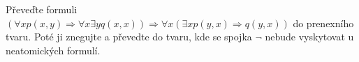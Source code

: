 Převeďte formuli $(\forall x p(x,y) \Rightarrow \forall x \exists y q(x,x))
\Rightarrow \forall x (\exists x p(y,x) \Rightarrow q(y,x))$ do prenexního
tvaru. Poté ji znegujte a převedte do tvaru, kde se spojka $\neg$ nebude
vyskytovat u neatomických formulí.
